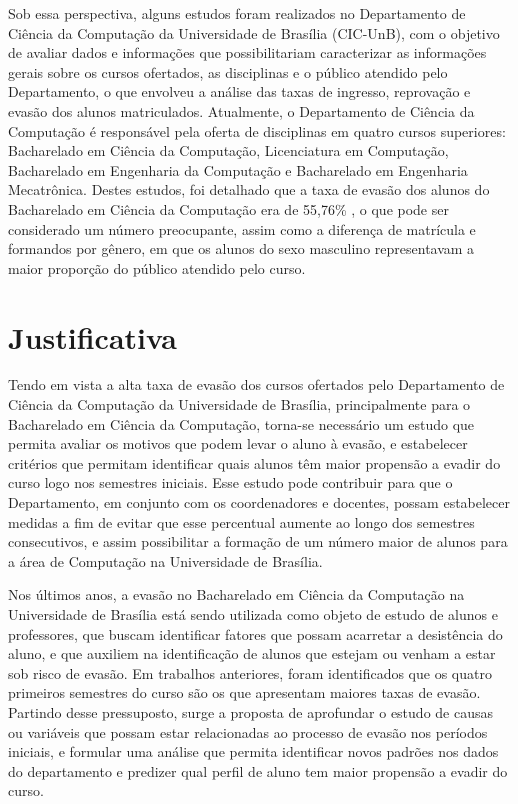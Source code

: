 Sob essa perspectiva, alguns estudos foram realizados no Departamento de Ciência da Computação da Universidade de Brasília (CIC-UnB), com o objetivo de avaliar dados e informações que possibilitariam caracterizar as informações gerais sobre os cursos ofertados, as disciplinas e o público atendido pelo Departamento, o que envolveu a análise das taxas de ingresso, reprovação e evasão dos alunos matriculados. Atualmente, o Departamento de Ciência da Computação é responsável pela oferta de disciplinas em quatro cursos superiores: Bacharelado em Ciência da Computação, Licenciatura em Computação, Bacharelado em Engenharia da Computação  e Bacharelado em Engenharia Mecatrônica. Destes estudos, foi detalhado que a taxa de evasão dos alunos do Bacharelado em Ciência da Computação era de 55,76\% \citep{palmeira_santos2014}, o que pode ser considerado um número preocupante, assim como a diferença de matrícula e formandos por gênero, em que os alunos do sexo masculino representavam a maior proporção do público atendido pelo curso.

\section{Justificativa} \label{1title4}

Tendo em vista a alta taxa de evasão dos cursos ofertados pelo Departamento de Ciência da Computação da Universidade de Brasília, principalmente para o Bacharelado em Ciência da Computação, torna-se necessário um estudo que permita avaliar os motivos que podem levar o aluno à evasão, e estabelecer critérios que permitam identificar quais alunos têm maior propensão a evadir do curso logo nos semestres iniciais. Esse estudo pode contribuir para que o Departamento, em conjunto com os coordenadores e docentes, possam estabelecer medidas a fim de evitar que esse percentual aumente ao longo dos semestres consecutivos, e assim possibilitar a formação de um número maior de alunos para a área de Computação na Universidade de Brasília.

Nos últimos anos, a evasão no Bacharelado em Ciência da Computação na Universidade de Brasília está sendo utilizada como objeto de estudo de alunos e professores, que buscam identificar fatores que possam acarretar a desistência do aluno, e que auxiliem na identificação de alunos que estejam ou venham a estar sob risco de evasão.
Em trabalhos anteriores, foram identificados que os quatro primeiros semestres do curso são os que apresentam maiores taxas de evasão. Partindo desse pressuposto, surge a proposta de aprofundar o estudo de causas ou variáveis que possam estar relacionadas ao processo de evasão nos períodos iniciais, e formular uma análise que permita identificar novos padrões nos dados do departamento e predizer qual perfil de aluno tem maior propensão a evadir do curso.

